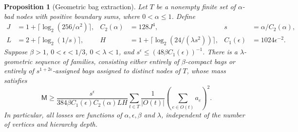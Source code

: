 \documentclass[11pt]{amsart}
\newtheorem{proposition}[theorem]{Proposition}
\theoremstyle{definition}
\theoremstyle{remark}
\numberwithin{equation}{section}
\begin{document}
\begin{proposition}[Geometric bag extraction]\label{prop:hierarchy-bags}
Let $T$ be a nonempty finite set of $\alpha$-bad nodes with positive boundary
sums, where $0<\alpha\le1$.  Define
\[
 \begin{aligned}
 J&=1+\lceil\log_2(256/\alpha^2)\rceil,
 &C_2(\alpha)&=128J^4,
 &s&=\alpha/C_2(\alpha),\\
 L&=2+\lceil\log_2(1/s)\rceil,
 &H&=1+\lceil\log_2(24/(\lambda s^2))\rceil,
 &C_1(\epsilon)&=1024\epsilon^{-2}.
 \end{aligned}
\]
Suppose $\beta>1$, $0<\epsilon<1/3$, $0<\lambda<1$, and
$s^\epsilon\le(48\beta C_1(\epsilon))^{-1}$.
There is a $\lambda$-geometric sequence of families, consisting either
entirely of $\beta$-compact bags or entirely of
$s^{1+2\epsilon}$-assigned bags assigned to distinct nodes of $T$,
whose mass satisfies
\begin{equation}\label{hb:extraction-bound}
 \mathsf M\ge
 \frac{s^\epsilon}{384\beta C_1(\epsilon)C_2(\alpha)LH}
 \sum_{t\in T}\frac1{|O(t)|}
                  \left(\sum_{e\in O(t)}a_e\right)^2.
\end{equation}
In particular, all losses are functions of $\alpha,\epsilon,\beta$
and $\lambda$, independent of the number of vertices and hierarchy depth.
\end{proposition}
\end{document}
